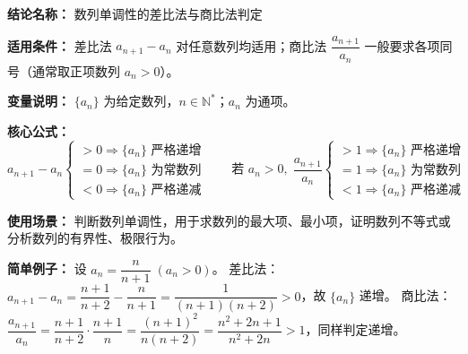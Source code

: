 \textbf{结论名称：} 数列单调性的差比法与商比法判定

\textbf{适用条件：} 差比法 \(a_{n+1}-a_n\) 对任意数列均适用；商比法 \(\dfrac{a_{n+1}}{a_n}\) 一般要求各项同号（通常取正项数列 \(a_n>0\)）。

\textbf{变量说明：} \(\{a_n\}\) 为给定数列，\(n\in\mathbb{N}^*\)；\(a_n\) 为通项。

\textbf{核心公式：}
\[
\boxed{
a_{n+1}-a_n
\begin{cases}
>0 \Rightarrow \{a_n\}\text{ 严格递增}\\
=0 \Rightarrow \{a_n\}\text{ 为常数列}\\
<0 \Rightarrow \{a_n\}\text{ 严格递减}
\end{cases}
\qquad
\text{若 } a_n>0,\;
\frac{a_{n+1}}{a_n}
\begin{cases}
>1 \Rightarrow \{a_n\}\text{ 严格递增}\\
=1 \Rightarrow \{a_n\}\text{ 为常数列}\\
<1 \Rightarrow \{a_n\}\text{ 严格递减}
\end{cases}
}
\]

\textbf{使用场景：} 判断数列单调性，用于求数列的最大项、最小项，证明数列不等式或分析数列的有界性、极限行为。

\textbf{简单例子：} 设 \(a_n = \dfrac{n}{n+1}\;(a_n>0)\)。  
差比法：\(a_{n+1}-a_n = \dfrac{n+1}{n+2}-\dfrac{n}{n+1} = \dfrac{1}{(n+1)(n+2)} >0\)，故 \(\{a_n\}\) 递增。  
商比法：\(\dfrac{a_{n+1}}{a_n} = \dfrac{n+1}{n+2}\cdot \dfrac{n+1}{n}= \dfrac{(n+1)^2}{n(n+2)} = \dfrac{n^2+2n+1}{n^2+2n}>1\)，同样判定递增。